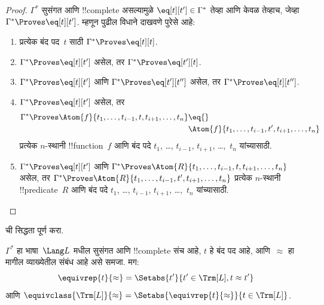 \documentclass[../../../include/open-logic-section]{subfiles}
\begin{document}
\begin{proof}
$\Gamma^*$ सुसंगत आणि !!{complete} असल्यामुळे $\eq[t][t'] \in
\Gamma^*$ तेव्हा आणि केवळ तेव्हाच, जेव्हा $\Gamma^* \Proves
\eq[t][t']$. म्हणून पुढील विधाने दाखवणे पुरेसे आहे:
\begin{enumerate}
\item प्रत्येक बंद पद~$t$ साठी $\Gamma^* \Proves \eq[t][t]$.
\item $\Gamma^* \Proves \eq[t][t']$ असेल, तर $\Gamma^* \Proves \eq[t'][t]$.
\item $\Gamma^* \Proves \eq[t][t']$ आणि $\Gamma^* \Proves
  \eq[t'][t'']$ असेल, तर $\Gamma^* \Proves \eq[t][t'']$.
\item $\Gamma^* \Proves \eq[t][t']$ असेल, तर
\[
\begin{aligned}
\Gamma^* \Proves \Atom{f}{t_1,\dots,t_{i-1},t,t_{i+1},\dots,t_n}
 & {}\eq{} \\
 & \Atom{f}{t_1,\dots,t_{i-1},t',t_{i+1},\dots,t_n}
\end{aligned}
\]
प्रत्येक $n$-स्थानी !!{function}~$f$ आणि बंद पदे $t_1$, \dots,
$t_{i-1}$, $t_{i+1}$, \dots,~$t_n$ यांच्यासाठी.
\item $\Gamma^* \Proves \eq[t][t']$ आणि
$\Gamma^* \Proves
\Atom{R}{t_1,\dots,t_{i-1},t,t_{i+1},\dots,t_n}$ असेल, तर
$\Gamma^* \Proves \Atom{R}{t_1,\dots,t_{i-1},t',t_{i+1},\dots,t_n}$
प्रत्येक $n$-स्थानी !!{predicate}~$R$ आणि बंद पदे $t_1$, \dots,
$t_{i-1}$, $t_{i+1}$, \dots,~$t_n$ यांच्यासाठी.
\end{enumerate}
%
\end{proof}

\begin{prob}
 ची सिद्धता पूर्ण करा.
\end{prob}

\begin{defn}
$\Gamma^*$ हा भाषा~$\Lang L$ मधील सुसंगत आणि !!{complete} संच आहे,
$t$ हे बंद पद आहे, आणि~$\approx$ हा मागील व्याख्येतील संबंध आहे असे
समजा. मग:
\[
\equivrep{t}{\approx} = \Setabs{t'}{t'\in \Trm[L], t \approx t'}
\]
आणि $\equivclass{\Trm[L]}{\approx} = \Setabs{\equivrep{t}{\approx}}{t \in \Trm[L]}$.
\end{defn}
\end{document}

